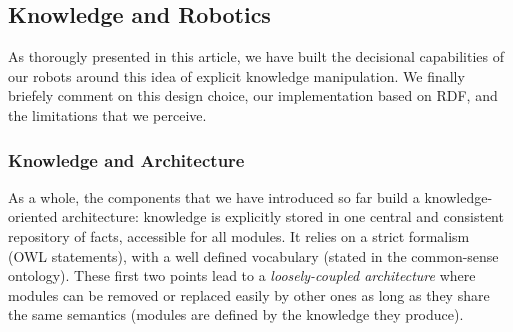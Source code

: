 \documentclass[preprint,3p,times]{elsarticle}
\newcommand{\eg}{{\textit{e.g.\ }}}
\begin{document}
%
%


\subsection{Knowledge and Robotics}
\label{krs-discussion}

As thorougly presented in this article, we have built the decisional
capabilities of our robots around this idea of explicit knowledge manipulation.
We finally briefely comment on this design choice, our implementation based on RDF,
and the limitations that we perceive.

\subsubsection{Knowledge and Architecture}

As a whole, the components that we have introduced so far build a
knowledge-oriented architecture: knowledge is explicitly stored in one central
and consistent repository of facts, accessible for all modules. It relies on a
strict formalism (OWL statements), with a well defined vocabulary
(stated in the common-sense ontology). These first two points lead to a
\emph{loosely-coupled architecture} where modules can be removed or replaced
easily by other ones as long as they share the same semantics (modules are
defined by the knowledge they produce).
\end{document}
